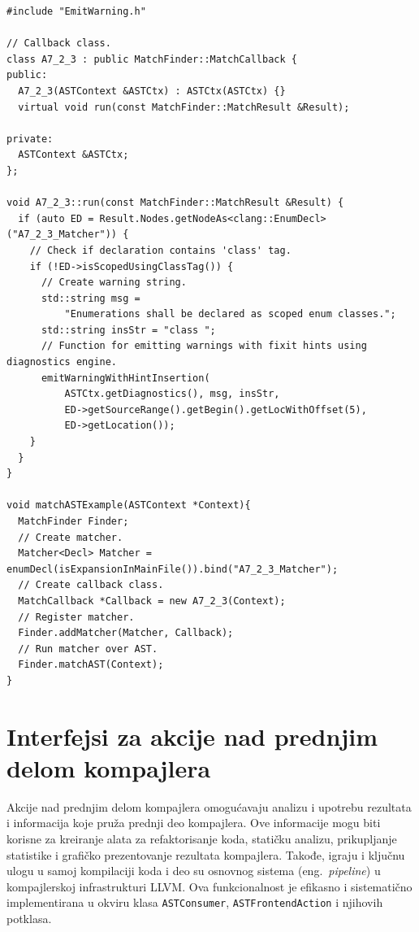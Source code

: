 \documentclass[12pt,oneside]{memoir}
\begin{document}
\begin{lstlisting}[style=customc,  caption={Primer upariva\v{c}a koji pronalazi sve deklaracije enumeratora koje ne koriste sintaksu \texttt{enum class}. Ovaj primer demonstrira i upotrebu klasa \texttt{MatchFinder}, \texttt{MatchCallback} i \texttt{MatchResult}. Funkcija \texttt{emitWarningWithHintInsertion} implementirana je na listingu \ref{lst:dijagnostika} i dostupna je kroz zaglavlje \texttt{EmitWarning.h}}, label=lst:MatcherList]
#include "EmitWarning.h"

// Callback class.
class A7_2_3 : public MatchFinder::MatchCallback {
public:
  A7_2_3(ASTContext &ASTCtx) : ASTCtx(ASTCtx) {}
  virtual void run(const MatchFinder::MatchResult &Result);

private:
  ASTContext &ASTCtx;
};

void A7_2_3::run(const MatchFinder::MatchResult &Result) {
  if (auto ED = Result.Nodes.getNodeAs<clang::EnumDecl>("A7_2_3_Matcher")) {
    // Check if declaration contains 'class' tag.
    if (!ED->isScopedUsingClassTag()) {
      // Create warning string.
      std::string msg =
          "Enumerations shall be declared as scoped enum classes.";
      std::string insStr = "class ";
      // Function for emitting warnings with fixit hints using diagnostics engine.
      emitWarningWithHintInsertion(
          ASTCtx.getDiagnostics(), msg, insStr,
          ED->getSourceRange().getBegin().getLocWithOffset(5),
          ED->getLocation());
    }
  }
}

void matchASTExample(ASTContext *Context){
  MatchFinder Finder;
  // Create matcher.
  Matcher<Decl> Matcher = enumDecl(isExpansionInMainFile()).bind("A7_2_3_Matcher");
  // Create callback class.
  MatchCallback *Callback = new A7_2_3(Context);
  // Register matcher.
  Finder.addMatcher(Matcher, Callback);
  // Run matcher over AST.
  Finder.matchAST(Context);
}
\end{lstlisting}


\section{Interfejsi za akcije nad prednjim delom kompajlera}
\label{sec:interfejsi}

Akcije nad prednjim delom kompajlera omogu\'{c}avaju analizu i upotrebu rezultata i informacija koje pru\v{z}a prednji deo kompajlera. Ove informacije mogu biti korisne za kreiranje alata za refaktorisanje koda, stati\v{c}ku analizu, prikupljanje statistike i grafi\v{c}ko prezentovanje rezultata kompajlera. Takođe, igraju i klju\v{c}nu ulogu u samoj kompilaciji koda i deo su osnovnog sistema (eng.~\textit{pipeline}) u kompajlerskoj infrastrukturi LLVM.
Ova funkcionalnost je efikasno i sistemati\v{c}no implementirana u okviru klasa \texttt{ASTConsumer}, \texttt{ASTFrontendAction} i njihovih potklasa.
\end{document}
